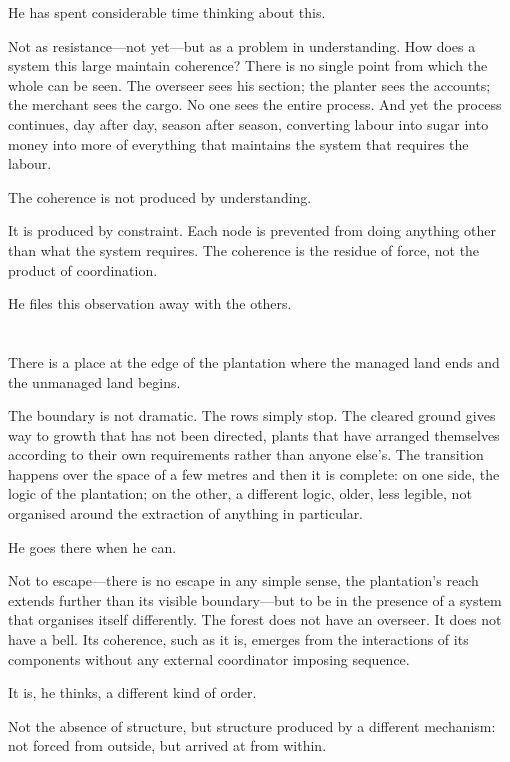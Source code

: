 He has spent considerable time thinking about this.

Not as resistance---not yet---but as a problem in understanding.
How does a system this large maintain coherence? There is no single
point from which the whole can be seen. The overseer sees his
section; the planter sees the accounts; the merchant sees the
cargo. No one sees the entire process. And yet the process
continues, day after day, season after season, converting labour
into sugar into money into more of everything that maintains the
system that requires the labour.

The coherence is not produced by understanding.

It is produced by constraint. Each node is prevented from doing
anything other than what the system requires. The coherence is the
residue of force, not the product of coordination.

He files this observation away with the others.

\section{}

There is a place at the edge of the plantation where the managed
land ends and the unmanaged land begins.

The boundary is not dramatic. The rows simply stop. The cleared
ground gives way to growth that has not been directed, plants that
have arranged themselves according to their own requirements rather
than anyone else's. The transition happens over the space of a few
metres and then it is complete: on one side, the logic of the
plantation; on the other, a different logic, older, less legible,
not organised around the extraction of anything in particular.

He goes there when he can.

Not to escape---there is no escape in any simple sense, the
plantation's reach extends further than its visible boundary---but
to be in the presence of a system that organises itself differently.
The forest does not have an overseer. It does not have a bell. Its
coherence, such as it is, emerges from the interactions of its
components without any external coordinator imposing sequence.

It is, he thinks, a different kind of order.

Not the absence of structure, but structure produced by a different
mechanism: not forced from outside, but arrived at from within.

